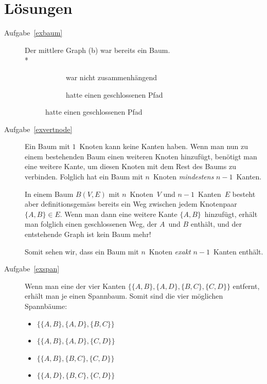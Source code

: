 \documentclass[12pt,a4paper]{report}
\theoremstyle{break}
\theoremstyle{plain}
\begin{document}
\newpage
\section{L\"{o}sungen}

\begin{description}
\item[Aufgabe~\ref{exbaum}] Der mittlere Graph (b) war bereits ein
  Baum.\\*
\begin{figure}[h!]
\setcounter{subfigure}{0}
\begin{subfigure}[b]{0.5\textwidth}
\caption{war nicht zusammenh\"{a}ngend}
\end{subfigure}
\begin{subfigure}[b]{0.5\textwidth}
\caption{hatte einen geschlossenen Pfad}
\end{subfigure}
\end{figure}

\item[Aufgabe~\ref{exvertnode}] 
Ein Baum mit $1$~Knoten kann keine Kanten haben. Wenn man nun zu 
einem bestehenden Baum einen weiteren Knoten hinzuf\"{u}gt, ben\"{o}tigt
man eine weitere Kante, um diesen Knoten mit dem Rest des Baums zu
verbinden. Folglich hat ein Baum mit $n$~Knoten \emph{mindestens}
$n-1$~Kanten.

In einem Baum $B(V,E)$ mit $n$~Knoten~$V$ und $n-1$~Kanten~$E$ besteht aber
definitionsgem\"{a}ss bereits ein Weg zwischen jedem Knotenpaar 
$\{A,B\}\in E$. Wenn man dann eine weitere Kante
$\{A,B\}$~hinzuf\"{u}gt, erh\"{a}lt man folglich einen geschlossenen
Weg, der $A$~und $B$ enth\"{a}lt, und der entstehende Graph ist kein
Baum mehr!

Somit sehen wir, dass ein Baum mit $n$~Knoten \emph{exakt}
$n-1$~Kanten enth\"{a}lt.
\item[Aufgabe~\ref{exspan}] Wenn man eine der vier Kanten $\{\{A,B\},
  \{A,D\}, \{B,C\}, \{C,D\}\}$ entfernt, erh\"{a}lt man je einen
  Spannbaum. Somit sind die vier m\"{o}glichen Spannb\"{a}ume:

\begin{itemize}
\item $\{\{A,B\}, \{A,D\}, \{B,C\}\}$
\item $\{\{A,B\}, \{A,D\}, \{C,D\}\}$
\item $\{\{A,B\}, \{B,C\}, \{C,D\}\}$
\item $\{\{A,D\}, \{B,C\}, \{C,D\}\}$
\end{itemize}


\end{description}
\end{document}
